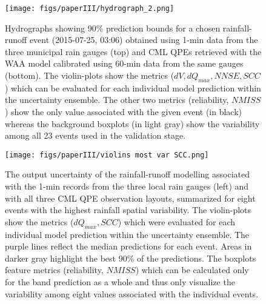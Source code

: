 \documentclass{ctuthesis}\usepackage[]{graphicx}\usepackage[]{color}
\begin{document}
\begin{figure}[p]
\begin{center}
\texttt{[image: figs/paperIII/hydrograph\_2.png]}
\caption{Hydrographs showing 90\% prediction bounds for a chosen rainfall-runoff event (2015-07-25, 03:06) obtained using 1-min data from the three municipal rain gauges (top) and CML QPEs retrieved with the WAA model calibrated using 60-min data from the same gauges (bottom). The violin-plots show the metrics ($dV, dQ_{max}, N\!N\!S\!E, S\!C\!C$) which can be evaluated for each individual model prediction within the uncertainty ensemble. The other two metrics (reliability, $N\!M\!I\!S\!S$) show the only value associated with the given event (in black) whereas the background boxplots (in light gray) show the variability among all 23 events used in the validation stage.} 
\label{fig:III_3_b} 
\end{center}
\end{figure}



\begin{figure}[p]
\begin{center}
\texttt{[image: figs/paperIII/violins most var SCC.png]}
\caption{The output uncertainty of the rainfall-runoff modelling associated with the 1-min records from the three local rain gauges (left) and with all three CML QPE observation layouts, summarized for eight events with the highest rainfall spatial variability. The violin-plots show the metrics ($dQ_{max}, S\!C\!C$) which were evaluated for each individual model prediction within the uncertainty ensemble. The purple lines reflect the median predictions for each event. Areas in darker gray highlight the best 90\% of the predictions. The boxplots feature metrics (reliability, $N\!M\!I\!S\!S$) which can be calculated only for the band prediction as a whole and thus only visualize the variability among eight values associated with the individual events.} 
\label{fig:III_5}
\end{center}
\end{figure}
\end{document}
